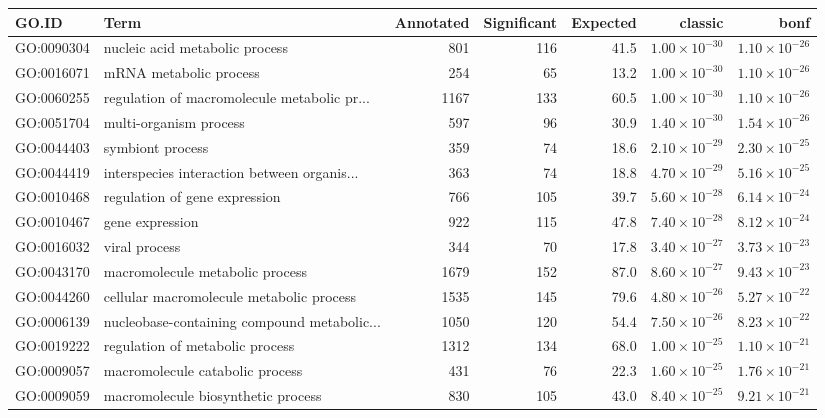 \begin{table}[ht]
\centering
\begin{tabular}{llrrrrr}
  \hline
GO.ID & Term & Annotated & Significant & Expected & classic & bonf \\ 
  \hline
GO:0090304 & nucleic acid metabolic process & 801 & 116 & 41.5 & $1.00 \times 10^{-30}$ & $1.10 \times 10^{-26}$ \\ 
  GO:0016071 & mRNA metabolic process & 254 & 65 & 13.2 & $1.00 \times 10^{-30}$ & $1.10 \times 10^{-26}$ \\ 
  GO:0060255 & regulation of macromolecule metabolic pr... & 1167 & 133 & 60.5 & $1.00 \times 10^{-30}$ & $1.10 \times 10^{-26}$ \\ 
  GO:0051704 & multi-organism process & 597 & 96 & 30.9 & $1.40 \times 10^{-30}$ & $1.54 \times 10^{-26}$ \\ 
  GO:0044403 & symbiont process & 359 & 74 & 18.6 & $2.10 \times 10^{-29}$ & $2.30 \times 10^{-25}$ \\ 
  GO:0044419 & interspecies interaction between organis... & 363 & 74 & 18.8 & $4.70 \times 10^{-29}$ & $5.16 \times 10^{-25}$ \\ 
  GO:0010468 & regulation of gene expression & 766 & 105 & 39.7 & $5.60 \times 10^{-28}$ & $6.14 \times 10^{-24}$ \\ 
  GO:0010467 & gene expression & 922 & 115 & 47.8 & $7.40 \times 10^{-28}$ & $8.12 \times 10^{-24}$ \\ 
  GO:0016032 & viral process & 344 & 70 & 17.8 & $3.40 \times 10^{-27}$ & $3.73 \times 10^{-23}$ \\ 
  GO:0043170 & macromolecule metabolic process & 1679 & 152 & 87.0 & $8.60 \times 10^{-27}$ & $9.43 \times 10^{-23}$ \\ 
  GO:0044260 & cellular macromolecule metabolic process & 1535 & 145 & 79.6 & $4.80 \times 10^{-26}$ & $5.27 \times 10^{-22}$ \\ 
  GO:0006139 & nucleobase-containing compound metabolic... & 1050 & 120 & 54.4 & $7.50 \times 10^{-26}$ & $8.23 \times 10^{-22}$ \\ 
  GO:0019222 & regulation of metabolic process & 1312 & 134 & 68.0 & $1.00 \times 10^{-25}$ & $1.10 \times 10^{-21}$ \\ 
  GO:0009057 & macromolecule catabolic process & 431 & 76 & 22.3 & $1.60 \times 10^{-25}$ & $1.76 \times 10^{-21}$ \\ 
  GO:0009059 & macromolecule biosynthetic process & 830 & 105 & 43.0 & $8.40 \times 10^{-25}$ & $9.21 \times 10^{-21}$ \\ 

\end{tabular}
\end{table}
